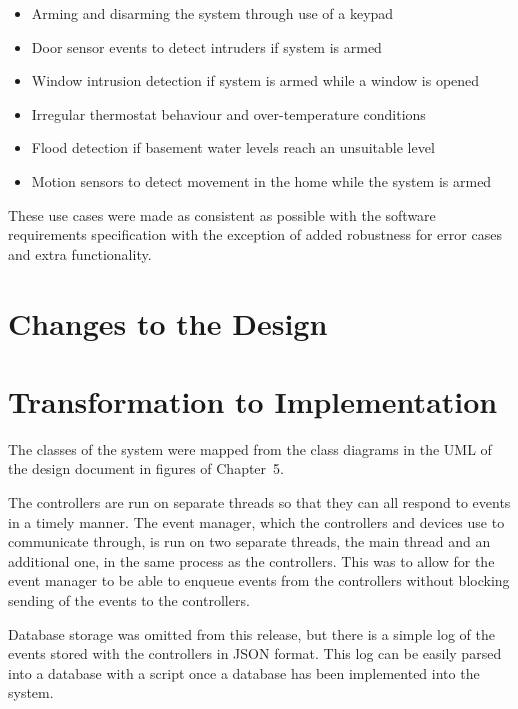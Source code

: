 \documentclass{article}
\begin{document}
\begin{itemize}
\item Arming and disarming the system through use of a keypad
\item Door sensor events to detect intruders if system is armed
\item Window intrusion detection if system is armed while a window is opened
\item Irregular thermostat behaviour and over-temperature conditions
\item Flood detection if basement water levels reach an unsuitable level
\item Motion sensors to detect movement in the home while the system is armed
\end{itemize}

These use cases were made as consistent as possible with the software requirements
specification with the exception of added robustness for error cases and extra
functionality.

\section{Changes to the Design} %

\section{Transformation to Implementation} %

The classes of the system were mapped from the class diagrams in the UML of the
design document in figures of Chapter~5. 

The controllers are run on separate threads so that they can all respond to
events in a timely manner. The event manager, which the controllers and devices
use to communicate through, is run on two separate threads, the main thread and
an additional one, in the same process as the controllers. This was to allow
for the event manager to be able to enqueue events from the controllers without
blocking sending of the events to the controllers.

Database storage was omitted from this release, but there is a simple log of
the events stored with the controllers in JSON format. This log can be easily
parsed into a database with a script once a database has been implemented into
the system.
\end{document}
